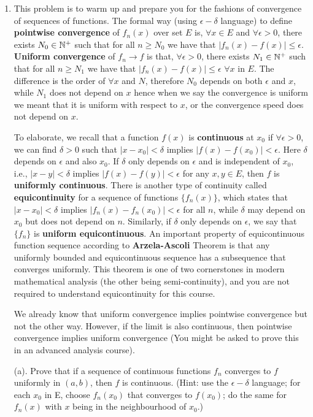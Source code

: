 \documentclass[6pt]{article}
\numberwithin{equation}{section}
\def\mathbb{\Bbb}
\begin{document}
\begin{enumerate}
\item This problem is to warm up and prepare you for the fashions of convergence of sequences of functions.  The formal way (using $\epsilon-\delta$ language) to define \textbf{pointwise convergence} of $f_n(x)$ over set $E$ is, $\forall x\in E$ and $\forall \epsilon>0$, there exists $N_0\in\mathbb N^+$ such that for all $n\geq N_0$ we have that $\vert f_n(x)-f(x)\vert \leq \epsilon$.  \textbf{Uniform convergence} of $f_n\rightarrow f$ is that, $\forall \epsilon>0$, there exists $N_1\in\mathbb N^+$ such that for all $n\geq N_1$ we have that $\vert f_n(x)-f(x)\vert \leq \epsilon$ $\forall x$ in $E$.  The difference is the order of $\forall x$ and $N$, therefore $N_0$ depends on both $\epsilon$ and $x$, while $N_1$ does not depend on $x$ hence when we say the convergence is uniform we meant that it is uniform with respect to $x$, or the convergence speed does not depend on $x$.

To elaborate, we recall that a function $f(x)$ is \textbf{continuous} at $x_0$ if $\forall \epsilon>0$, we can find $\delta>0$ such that $\vert x-x_0\vert<\delta$ implies $\vert f(x)-f(x_0) \vert<\epsilon$.  Here $\delta$ depends on $\epsilon$ and also $x_0$.  If $\delta$ only depends on $\epsilon$ and is independent of $x_0$, i.e., $\vert x-y\vert<\delta$ implies $\vert f(x)-f(y) \vert<\epsilon$ for any $x,y\in E$, then $f$ is \textbf{uniformly continuous}.  There is another type of continuity called \textbf{equicontinuity} for a sequence of functions $\{f_n(x)\}$, which states that $\vert x-x_0\vert<\delta$ implies $\vert f_n(x)-f_n(x_0) \vert<\epsilon$ for all $n$, while $\delta$ may depend on $x_0$ but does not depend on $n$.  Similarly, if $\delta$ only depends on $\epsilon$, we say that $\{f_n\}$ is \textbf{uniform equicontinuous}.  An important property of equicontinuous function sequence according to \textbf{Arzela-Ascoli} Theorem is that any uniformly bounded and equicontinuous sequence has a subsequence that converges uniformly.  This theorem is one of two cornerstones in modern mathematical analysis (the other being semi-continuity), and you are not required to understand equicontinuity for this course.

We already know that uniform convergence implies pointwise convergence but not the other way.  However, if the limit is also continuous, then pointwise convergence implies uniform convergence (You might be asked to prove this in an advanced analysis course).

(a).  Prove that if a sequence of continuous functions $f_n$ converges to $f$ uniformly in $(a,b)$, then $f$ is continuous.  (Hint: use the $\epsilon-\delta$ language; for each $x_0$ in E, choose $f_n(x_0)$ that converges to $f(x_0)$; do the same for $f_n(x)$ with $x$ being in the neighbourhood of $x_0$.)


\end{enumerate}
\end{document}
